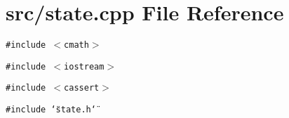 \section{src/state.cpp File Reference}
\label{state_8cpp}
{\tt \#include $<$cmath$>$}\par
{\tt \#include $<$iostream$>$}\par
{\tt \#include $<$cassert$>$}\par
{\tt \#include \char`\"{}state.h\char`\"{}}\par
